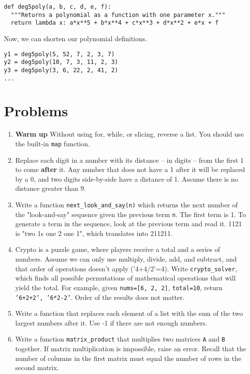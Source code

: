 \documentclass[a4paper]{book}
\begin{document}
\begin{lstlisting}
def deg5poly(a, b, c, d, e, f):
  """Returns a polynomial as a function with one parameter x."""
  return lambda x: a*x**5 + b*x**4 + c*x**3 + d*x**2 + e*x + f
\end{lstlisting}
Now, we can shorten our polynomial definitions.
\begin{lstlisting}
y1 = deg5poly(5, 52, 7, 2, 3, 7)
y2 = deg5poly(10, 7, 3, 11, 2, 3)
y3 = deg5poly(3, 6, 22, 2, 41, 2)
...
\end{lstlisting} 

\section{Problems}

\begin{enumerate}
	\item \textbf{Warm up} Without using for, while, or slicing, reverse a list. You should use the built-in {\tt map} function.
    \item Replace each digit in a number with its distance -- in digits -- from the first 1 to come \textbf{after} it. Any number that does not have a 1 after it will be replaced by a 0, and two digits side-by-side have a distance of 1. Assume there is no distance greater than 9.
    \item Write a function {\tt next\_look\_and\_say(n)} which returns the next number of the "look-and-say" sequence given the previous term {\tt n}. The first term is 1. To generate a term in the sequence, look at the previous term and read it. 1121 is "two 1s one 2 one 1", which translates into 211211.
    \item Crypto is a puzzle game, where players receive a total and a series of numbers. Assume we can only use multiply, divide, add, and subtract, and that order of operations doesn't apply ('4+4/2'=4). Write {\tt crypto\_solver}, which finds all possible permutations of mathematical operations that will yield the total. For example, given {\tt nums=[6, 2, 2]}, {\tt total=10}, return {\tt {'6+2+2', '6*2-2'}}. Order of the results does not matter.
    \item Write a function that replaces each element of a list with the sum of the two largest numbers after it. Use -1 if there are not enough numbers.
    \item Write a function {\tt matrix\_product} that multiplies two matrices {\tt A} and {\tt B} together. If matrix multiplication is impossible, raise an error. Recall that the number of columns in the first matrix must equal the number of rows in the second matrix.
\end{enumerate}
\end{document}
